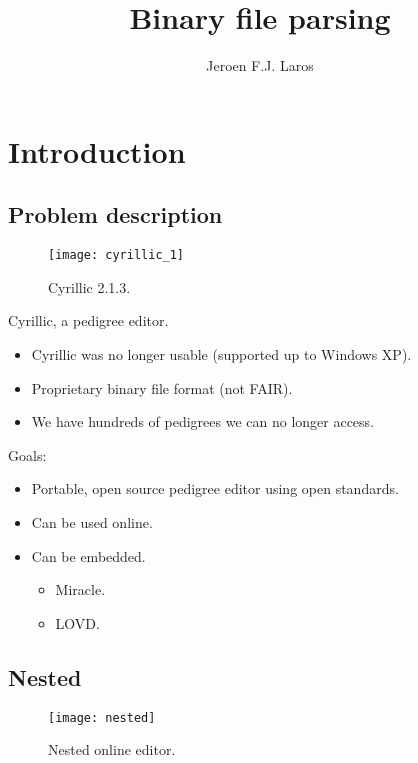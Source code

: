 \documentclass[slidestop]{beamer}
\author{Jeroen F.J. Laros}
\title{Binary file parsing}
\begin{document}


\section{Introduction}
\makeTableOfContents

\subsection{Problem description}
\begin{pframe}
  \begin{figure}[]
    \begin{center}
      \texttt{[image: cyrillic\_1]}
    \end{center}
    \caption{Cyrillic 2.1.3.}
  \end{figure}
\end{pframe}

\begin{pframe}
  Cyrillic, a pedigree editor.
  \begin{itemize}
    \item Cyrillic was no longer usable (supported up to Windows XP).
    \item Proprietary binary file format (not FAIR).
    \item We have hundreds of pedigrees we can no longer access.
  \end{itemize}
  \bigskip

  Goals:
  \begin{itemize}
    \item Portable, open source pedigree editor using open standards.
    \item Can be used online.
    \item Can be embedded.
    \begin{itemize}
      \item Miracle.
      \item LOVD.
    \end{itemize}
  \end{itemize}
\end{pframe}

\subsection{Nested}
\begin{pframe}
  \begin{figure}[]
    \begin{center}
      \texttt{[image: nested]}
    \end{center}
    \caption{Nested online editor.}
  \end{figure}
\end{pframe}
\end{document}

